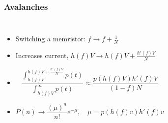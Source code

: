 \documentclass[mathserif]{beamer}
\begin{document}
\begin{frame}
\frametitle{Avalanches}
\begin{columns}
\begin{itemize}
\item<2-> Switching a memristor: $f\to f+\frac{1}{N}$

\item<3-> Increases current, $h(f)V\to h(f)V + \frac{h'(f)V}{N}$

\item<4-> $$\frac{\int_{h(f)V}^{h(f)V + \frac{h'(f)V}{N}} p(t) }{\int_{h(f)V}^{\infty} p(t)} \approx \frac{p(h(f)V)h'(f)V}{(1-f)N}$$

\item<5-> $$P(n) \to \frac{(\mu)^n}{n!} e^{-\mu}, \quad \mu = p(h(f)v)h'(f)v$$


\end{itemize}
\end{columns}
\end{frame}
\end{document}
